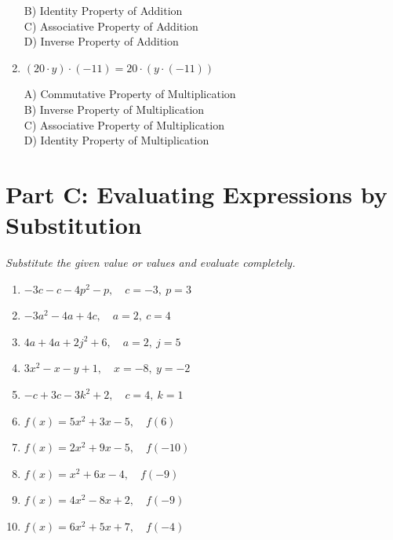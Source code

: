\documentclass[11pt]{article}
\begin{document}
\begin{enumerate}
\begin{minipage}{\linewidth}
B) Identity Property of Addition \\
C) Associative Property of Addition \\
D) Inverse Property of Addition
\end{minipage}
  \vspace{0.3cm}
  \item $(20 \cdot y) \cdot (-11) = 20 \cdot (y \cdot (-11))$
\\[2pt]
\begin{minipage}{\linewidth}
A) Commutative Property of Multiplication \\
B) Inverse Property of Multiplication \\
C) Associative Property of Multiplication \\
D) Identity Property of Multiplication
\end{minipage}
  \vspace{0.3cm}
\end{enumerate}

\section*{Part C: Evaluating Expressions by Substitution}
\noindent\textit{Substitute the given value or values and evaluate completely.}
\begin{multicols}{2}
\begin{enumerate}
  \item $- 3 c - c - 4 p^{2} - p, \quad c = -3,\ p = 3$
  \vspace{1.3cm}
  \item $- 3 a^{2} - 4 a + 4 c, \quad a = 2,\ c = 4$
  \vspace{1.3cm}
  \item $4 a + 4 a + 2 j^{2} + 6, \quad a = 2,\ j = 5$
  \vspace{1.3cm}
  \item $3 x^{2} - x - y + 1, \quad x = -8,\ y = -2$
  \vspace{1.3cm}
  \item $- c + 3 c - 3 k^{2} + 2, \quad c = 4,\ k = 1$
  \vspace{1.3cm}
  \item $f(x) = 5x^{2} + 3x - 5, \quad f(6)$
  \vspace{1.3cm}
  \item $f(x) = 2x^{2} + 9x - 5, \quad f(-10)$
  \vspace{1.3cm}
  \item $f(x) = x^{2} + 6x - 4, \quad f(-9)$
  \vspace{1.3cm}
  \item $f(x) = 4x^{2} - 8x + 2, \quad f(-9)$
  \vspace{1.3cm}
  \item $f(x) = 6x^{2} + 5x + 7, \quad f(-4)$
  \vspace{1.3cm}
\end{enumerate}
\end{multicols}
\end{document}
